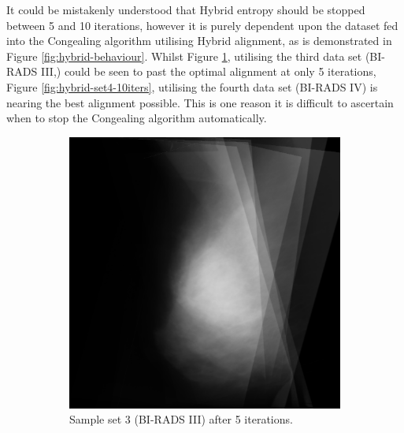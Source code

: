 It could be mistakenly understood that Hybrid entropy should be stopped between 5 and 10 iterations, however it is purely dependent upon the dataset fed into the \Gls{Congealing} algorithm utilising Hybrid alignment, as is demonstrated in Figure \ref{fig:hybrid-behaviour}. Whilst Figure \ref{fig:hybrid-set3-5iters}, utilising the third data set (BI-RADS III,) could be seen to past the optimal alignment at only 5 iterations, Figure \ref{fig:hybrid-set4-10iters}, utilising the fourth data set (BI-RADS IV) is nearing the best alignment possible. This is one reason it is difficult to ascertain when to stop the \Gls{Congealing} algorithm automatically.

\begin{figure}[H]
    \centering
    \begin{subfigure}[t]{0.4\textwidth}
      \includegraphics[width=\textwidth]{Appendix5/sample3/hybrid/5_hybrid.png}
        \caption{Sample set 3 (BI-RADS III) after 5 iterations.}
        \label{fig:hybrid-set3-5iters}
    \end{subfigure} \hfill
    \begin{subfigure}[t]{0.4\textwidth}

\end{subfigure}
\end{figure}
